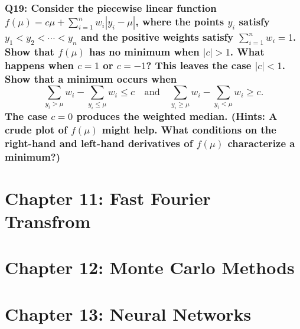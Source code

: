 \documentclass{article}
\begin{document}
\subsubsection*{Q19: Consider the piecewise linear function \( f(\mu) = c\mu + \sum_{i=1}^{n} w_i |y_i - \mu| \), where the points \( y_i \) satisfy \( y_1 < y_2 < \cdots < y_n \) and the positive weights satisfy \( \sum_{i=1}^{n} w_i = 1 \). Show that \( f(\mu) \) has no minimum when \( |c| > 1 \). What happens when \( c = 1 \) or \( c = -1 \)? This leaves the case \( |c| < 1 \). Show that a minimum occurs when
\[
\sum_{y_i > \mu} w_i - \sum_{y_i \leq \mu} w_i \leq c \quad \text{and} \quad \sum_{y_i \geq \mu} w_i - \sum_{y_i < \mu} w_i \geq c.
\]
The case \( c = 0 \) produces the weighted median. (Hints: A crude plot of \( f(\mu) \) might help. What conditions on the right-hand and left-hand derivatives of \( f(\mu) \) characterize a minimum?)}

\newpage
\section*{Chapter 11: Fast Fourier Transfrom}

\newpage
\section*{Chapter 12: Monte Carlo Methods}

\newpage
\section*{Chapter 13: Neural Networks}
\end{document}
